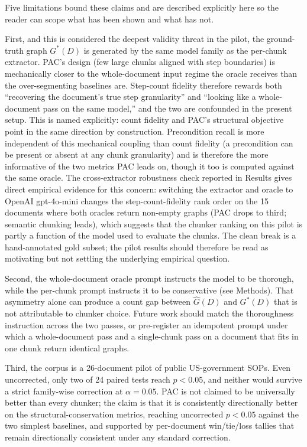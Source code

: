 \documentclass[fleqn,10pt]{wlscirep}
\begin{document}
Five limitations bound these claims and are described explicitly here
so the reader can scope what has been shown and what has not.

First, and this is considered the deepest validity threat in the
pilot, the ground-truth graph $G^{*}(D)$ is generated by the same
model family as the per-chunk extractor. PAC's design (few large
chunks aligned with step boundaries) is mechanically closer to the
whole-document input regime the oracle receives than the
over-segmenting baselines are. Step-count fidelity therefore rewards
both ``recovering the document's true step granularity'' and ``looking
like a whole-document pass on the same model,'' and the two are
confounded in the present setup. This is named explicitly: count
fidelity and PAC's structural objective point in the same direction by
construction. Precondition recall is more independent of this
mechanical coupling than count fidelity (a precondition can be present
or absent at any chunk granularity) and is therefore the more
informative of the two metrics PAC leads on, though it too is computed
against the same oracle. The cross-extractor robustness check reported
in Results gives direct empirical evidence for this concern: switching
the extractor and oracle to OpenAI gpt-4o-mini changes the
step-count-fidelity rank order on the 15 documents where both oracles
return non-empty graphs (PAC drops to third; semantic chunking leads),
which suggests that the chunker ranking on this pilot is partly a
function of the model used to evaluate the chunks. The clean break is
a hand-annotated gold subset; the pilot results should therefore be
read as motivating but not settling the underlying empirical question.

Second, the whole-document oracle prompt instructs the model to be
thorough, while the per-chunk prompt instructs it to be conservative
(see Methods). That asymmetry alone can produce a count gap between
$\hat{G}(D)$ and $G^{*}(D)$ that is not attributable to chunker choice.
Future work should match the thoroughness instruction across the two
passes, or pre-register an idempotent prompt under which a
whole-document pass and a single-chunk pass on a document that fits in
one chunk return identical graphs.

Third, the corpus is a 26-document pilot of public US-government SOPs.
Even uncorrected, only two of 24 paired tests reach $p<0.05$, and
neither would survive a strict family-wise correction at
$\alpha=0.05$. PAC is not claimed to be universally better than every
chunker; the claim is that it is consistently directionally better on
the structural-conservation metrics, reaching uncorrected $p<0.05$
against the two simplest baselines, and supported by per-document
win/tie/loss tallies that remain directionally consistent under any
standard correction.
\end{document}

